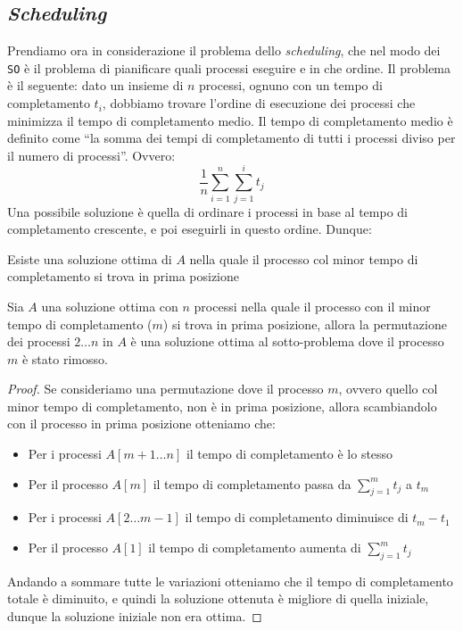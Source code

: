     \subsection{\textit{Scheduling}}
        Prendiamo ora in considerazione il problema dello \textit{scheduling}, che nel modo dei \texttt{SO} è il problema di pianificare quali processi eseguire e in che ordine. Il problema è il seguente: dato un insieme di $n$ processi, ognuno con un tempo di completamento $t_i$, dobbiamo trovare l'ordine di esecuzione dei processi che minimizza il tempo di completamento medio. Il tempo di completamento medio è definito come ``la somma dei tempi di completamento di tutti i processi diviso per il numero di processi''. Ovvero:
        $$
            \frac{1}{n}\sum_{i=1}^n \sum_{j=1}^i t_j
        $$
        Una possibile soluzione è quella di ordinare i processi in base al tempo di completamento crescente, e poi eseguirli in questo ordine. Dunque:
        \begin{theorem}
            Esiste una soluzione ottima di $A$ nella quale il processo col minor tempo di completamento si trova in prima posizione
        \end{theorem}
        \begin{theorem}
            Sia $A$ una soluzione ottima con $n$ processi nella quale il processo con il minor tempo di completamento ($m$) si trova in prima posizione, allora la permutazione dei processi $2\dots n$ in $A$ è una soluzione ottima al sotto-problema dove il processo $m$ è stato rimosso.
        \end{theorem}
        \begin{proof}
            Se consideriamo una permutazione dove il processo $m$, ovvero quello col minor tempo di completamento, non è in prima posizione, allora scambiandolo con il processo in prima posizione otteniamo che:
            \begin{itemize}
                \item Per i processi $A[m+1\dots n]$ il tempo di completamento è lo stesso
                \item Per il processo $A[m]$ il tempo di completamento passa da $\sum_{j=1}^m t_j$ a $t_m$
                \item Per i processi $A[2\dots m-1]$ il tempo di completamento diminuisce di $t_m - t_1$
                \item Per il processo $A[1]$ il tempo di completamento aumenta di $\sum_{j=1}^m t_j$
            \end{itemize}
            Andando a sommare tutte le variazioni otteniamo che il tempo di completamento totale è diminuito, e quindi la soluzione ottenuta è migliore di quella iniziale, dunque la soluzione iniziale non era ottima.
        \end{proof}
